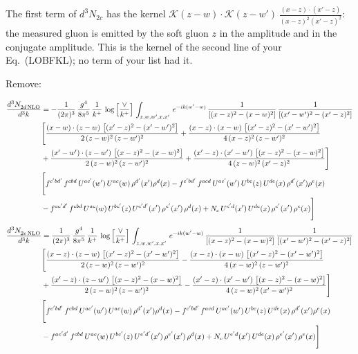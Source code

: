 \documentclass[9pt]{article}
\newcommand{\new}[1]{{\color{blue}#1}}
\numberwithin{equation}{section}
\begin{document}
\new{The first term of $d^3N_{2c}$ has the kernel $\mathcal K(z-w)\cdot\mathcal K(z-w')\,\frac{(x-z)\cdot(x'-z)}{(x-z)^2(x'-z)^2}$: the measured gluon is emitted by the soft gluon $z$ in the amplitude and in the conjugate amplitude. This is the kernel of the second line of your Eq.~(LOBFKL); no term of your list had it.}

\new{Remove:}

{\color{red}\begin{align}
 \frac{d^{3}N_{2d\,\rm NLO}^{\rm}}{d^{3}k}  & = -\frac{1}{(2\pi)^{3}}\, \frac{g^{4}}{8\pi^{5}}\,\frac{1}{k^{+}}\,\log{\left[\frac{\vee}{k^{+}}\right]}\,\int_{z,w,w^{\prime},x,x'}\, e^{-ik(w^{\prime}-w)}\,\frac{1}{\left[(x-z)^{2}-(x-w)^{2}\right]}\, \frac{1}{\left[(x'-w')^{2}-(x'-z)^{2}\right]}\notag \\ & \Bigg[\frac{(x-w)\cdot (z-w)\, \left[(x'-z)^{2}-(x'-w')^{2}\right]}{2\, (z-w)^{2}\, (z-w')^{2}}  + \frac{(x-z)\cdot (x-w)\,\left[(x'-z)^{2}-(x'-w')^{2}\right] }{4\,(x-z)^{2}\,(z-w')^{2}}\notag \\ & +\frac{(x'-w')\cdot (z-w')\, \left[(x-z)^{2}-(x-w)^{2}\right]}{2\, (z-w)^{2}\, (z-w')^{2}}+ \frac{(x'-z)\cdot (x'-w')\, \left[(x-z)^{2}-(x-w)^{2}\right]}{4\, (z-w)^{2}\,(x'-z)^{2}}\Bigg] \notag \\ &  \Bigg[f^{c'bd'}\,f^{cbd}\, U^{ac'}(w')\,U^{ac}(w)\,\rho^{d'}(x')\rho^{d}(x)- f^{c'bd'}\,f^{acd}\,U^{ac'}(w')\,U^{bc}(z)\,U^{de}(x)\,\rho^{d'}(x')\rho^{e}(x) \notag \\ & -f^{ac'd'}\,f^{cbd}\,U^{ac}(w)\,U^{bc'}(z)\,U^{e'd'}(x')\,\rho^{e'}(x')\,\rho^{d}(x) +N_{c}\,U^{e'd}(x')\,U^{de}(x)\,\rho^{e'}(x')\,\rho^{e}(x)\Bigg]
\end{align}}
{\color{red}\begin{align}
 \frac{d^{3}N_{2e\,\rm NLO}^{\rm}}{d^{3}k}  & = \frac{1}{(2\pi)^{3}}\, \frac{g^{4}}{8\pi^{5}}\,\frac{1}{k^{+}}\,\log{\left[\frac{\vee}{k^{+}}\right]}\,\int_{z,w,w^{\prime},x,x'}\, e^{-ik(w^{\prime}-w)}\, \frac{1}{\left[(x-z)^{2}-(x-w)^{2}\right]}\, \frac{1}{\left[(x'-w')^{2} - (x'-z)^{2}\right]} \notag \\ & \Bigg[\frac{(x-z)\cdot (z-w)\, \left[(x'-z)^{2}-(x'-w')^{2}\right]}{2\, (z-w)^{2}\, (z-w')^{2}}  - \frac{(x-z)\cdot (x-w)\,\left[(x'-z)^{2}-(x'-w')^{2}\right] }{4\,(x-w)^{2}\,(z-w')^{2}}\notag \\ & +\frac{(x'-z)\cdot (z-w')\, \left[(x-z)^{2}-(x-w)^{2}\right]}{2\, (z-w)^{2}\, (z-w')^{2}}-\frac{(x'-z)\cdot (x'-w')\, \left[(x-z)^{2}-(x-w)^{2}\right]}{4\, (z-w)^{2}\,(x'-w')^{2}}\Bigg]\notag \\ & \Bigg[f^{c'bd'}\,f^{cbd}\, U^{ac'}(w')\,U^{ac}(w)\,\rho^{d'}(x')\rho^{d}(x)- f^{c'bd'}\,f^{acd}\,U^{ac'}(w')\,U^{bc}(z)\,U^{de}(x)\,\rho^{d'}(x')\rho^{e}(x) \notag \\ & -f^{ac'd'}\,f^{cbd}\,U^{ac}(w)\,U^{bc'}(z)\,U^{e'd'}(x')\,\rho^{e'}(x')\,\rho^{d}(x) +N_{c}\,U^{e'd}(x')\,U^{de}(x)\,\rho^{e'}(x')\,\rho^{e}(x)\Bigg]
\end{align}}
\end{document}
